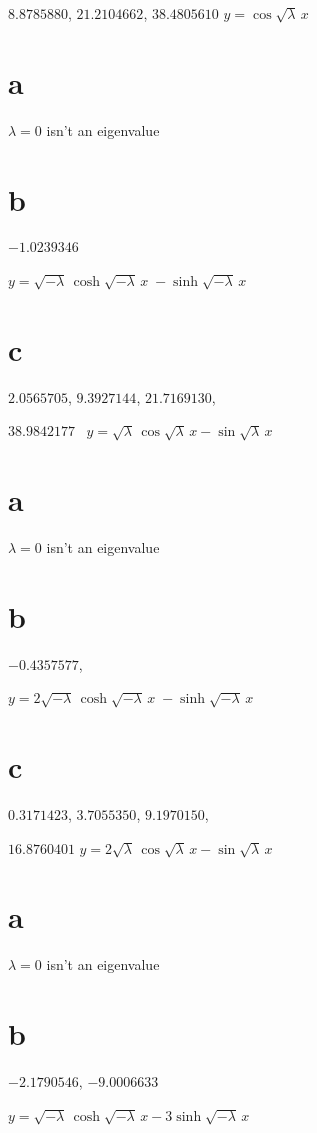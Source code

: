 \quad \quad
$8.8785880$, $21.2104662$, $38.4805610$
$y=\cos\sqrt{\lambda}\,x$
\smallskip

 \part{a} $\lambda=0$ isn't  an eigenvalue\;
\part{b}  $-1.0239346$\;

\quad \quad
$y=\sqrt{-\lambda}\,\cosh\sqrt{-\lambda}\,x\;
-\sinh\sqrt{-\lambda}\,x$
\part{c} $2.0565705$, $9.3927144$, $21.7169130$,

\quad \quad
$38.9842177$  \,
$y=\sqrt{\lambda}\,\cos\sqrt{\lambda}\,x-\sin\sqrt{\lambda}\,x$

\smallskip

 \part{a} $\lambda=0$ isn't  an eigenvalue\;
 \part{b} $-0.4357577$,

\quad \quad
$y=2\sqrt{-\lambda}\,\cosh\sqrt{-\lambda}\,x\;
-\sinh\sqrt{-\lambda}\,x$
\part{c} $0.3171423$, $3.7055350$, $9.1970150$,

\quad \quad
 $16.8760401$\;
$y=2\sqrt{\lambda}\,\cos\sqrt{\lambda}\,x-\sin\sqrt{\lambda}\,x$
\smallskip

 \part{a} $\lambda=0$ isn't  an eigenvalue\;
\part{b} $-2.1790546$, $-9.0006633$

\quad \quad
$y=\sqrt{-\lambda}\,\cosh\sqrt{-\lambda}\,x-3\sinh\sqrt{-\lambda}\,x$

